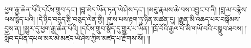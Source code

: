 ཕྱག་རྒྱ་ཆེན་པོའི་དངོས་གྲུབ་དང་། །བླ་མེད་ཡོན་ཏན་ཡེ་ཤེས་དང་། །མཐུ་རྣམས་ཆེ་བས་འབྱུང་བ་ནི། །བླ་མ་བརྙེས་ལས་རྙེད་པའི། །དེ་ཉིད་བདུད་རྩི་བཅུད་ལེན་གྱི། །གུས་པས་རྟག་ཏུ་ཉིན་མཚན་དུ། །རྒྱུན་མི་འཆད་པར་བསྒོམས་བྱས་ན། །མྱུར་དུ་ཕྱག་རྒྱ་ཆེན་པོའི། །དངོས་གྲུབ་སྣོད་དུ་གྱུར་པ་ཡིན། །ཁྲོ་བོའི་རྒྱལ་པོ་མི་གཡོ་བའི་བསྒྲུབ་ཐབས། །སློབ་དཔོན་དཔལ་མར་མེ་མཛད་ཡེ་ཤེས་ཀྱིས་མཛད་པ་རྫོགས་སོ།། །།